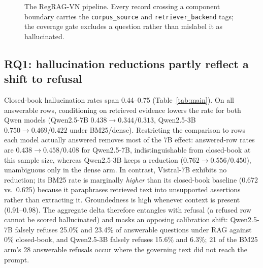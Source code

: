 \documentclass[conference,a4paper]{IEEEtran}
\begin{document}
\begin{figure}[t]
\centering
{}
\caption{The RegRAG-VN pipeline. Every record crossing a component boundary carries the \texttt{corpus\_source} and \texttt{retriever\_backend} tags; the coverage gate excludes a question rather than mislabel it as hallucinated.}
\label{fig:pipeline}
\end{figure}

\subsection{RQ1: hallucination reductions partly reflect a shift to refusal}
Closed-book hallucination rates span 0.44--0.75 (Table~\ref{tab:main}). On all answerable rows, conditioning on retrieved evidence lowers the rate for both Qwen models (Qwen2.5-7B $0.438\!\to\!0.344/0.313$, Qwen2.5-3B $0.750\!\to\!0.469/0.422$ under BM25/dense). Restricting the comparison to rows each model actually answered removes most of the 7B effect: answered-row rates are $0.438\to0.458/0.408$ for Qwen2.5-7B, indistinguishable from closed-book at this sample size, whereas Qwen2.5-3B keeps a reduction ($0.762\to0.556/0.450$), unambiguous only in the dense arm. In contrast, Vistral-7B exhibits no reduction; its BM25 rate is marginally \emph{higher} than its closed-book baseline (0.672 vs.\ 0.625) because it paraphrases retrieved text into unsupported assertions rather than extracting it. Groundedness is high whenever context is present (0.91--0.98). The aggregate delta therefore entangles with refusal (a refused row cannot be scored hallucinated) and masks an opposing calibration shift: Qwen2.5-7B falsely refuses 25.0\% and 23.4\% of answerable questions under RAG against 0\% closed-book, and Qwen2.5-3B falsely refuses 15.6\% and 6.3\%; 21 of the BM25 arm's 28 answerable refusals occur where the governing text did not reach the prompt.
\end{document}
